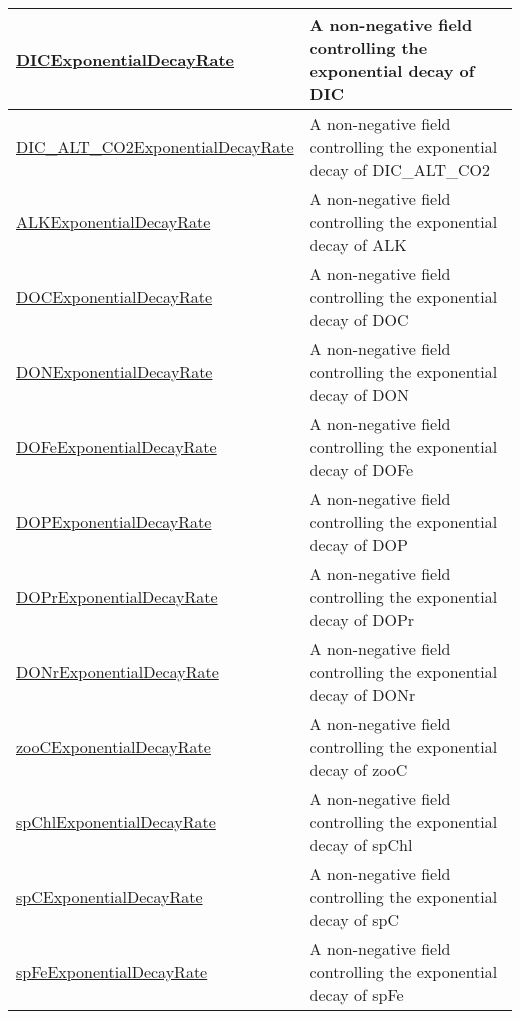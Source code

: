 {\begin{center}
\begin{longtable}{| p{2.0in} | p{4.0in} |}
    \hline
    \hyperref[subsec:var_sec_forcing_DICExponentialDecayRate]{DICExponentialDecayRate} & A non-negative field controlling the exponential decay of DIC \\
    \hline
    \hyperref[subsec:var_sec_forcing_DIC_ALT_CO2ExponentialDecayRate]{DIC\_ALT\_CO2Exponential\-DecayRate} & A non-negative field controlling the exponential decay of DIC\_ALT\_CO2 \\
    \hline
    \hyperref[subsec:var_sec_forcing_ALKExponentialDecayRate]{ALKExponentialDecayRate} & A non-negative field controlling the exponential decay of ALK \\
    \hline
    \hyperref[subsec:var_sec_forcing_DOCExponentialDecayRate]{DOCExponentialDecayRate} & A non-negative field controlling the exponential decay of DOC \\
    \hline
    \hyperref[subsec:var_sec_forcing_DONExponentialDecayRate]{DONExponentialDecayRate} & A non-negative field controlling the exponential decay of DON \\
    \hline
    \hyperref[subsec:var_sec_forcing_DOFeExponentialDecayRate]{DOFeExponentialDecayRate} & A non-negative field controlling the exponential decay of DOFe \\
    \hline
    \hyperref[subsec:var_sec_forcing_DOPExponentialDecayRate]{DOPExponentialDecayRate} & A non-negative field controlling the exponential decay of DOP \\
    \hline
    \hyperref[subsec:var_sec_forcing_DOPrExponentialDecayRate]{DOPrExponentialDecayRate} & A non-negative field controlling the exponential decay of DOPr \\
    \hline
    \hyperref[subsec:var_sec_forcing_DONrExponentialDecayRate]{DONrExponentialDecayRate} & A non-negative field controlling the exponential decay of DONr \\
    \hline
    \hyperref[subsec:var_sec_forcing_zooCExponentialDecayRate]{zooCExponentialDecayRate} & A non-negative field controlling the exponential decay of zooC \\
    \hline
    \hyperref[subsec:var_sec_forcing_spChlExponentialDecayRate]{spChlExponentialDecayRate} & A non-negative field controlling the exponential decay of spChl \\
    \hline
    \hyperref[subsec:var_sec_forcing_spCExponentialDecayRate]{spCExponentialDecayRate} & A non-negative field controlling the exponential decay of spC \\
    \hline
    \hyperref[subsec:var_sec_forcing_spFeExponentialDecayRate]{spFeExponentialDecayRate} & A non-negative field controlling the exponential decay of spFe \\

\end{longtable}
\end{center}}
